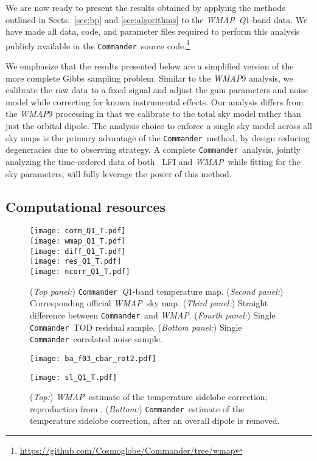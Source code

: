 \documentclass[twocolumn]{aa}
\def\WMAP{\emph{WMAP}}
\def\commander{\texttt{Commander}}
\newcommand{\Q}[0]{\textit Q}
\begin{document}
We are now ready to present the results obtained by applying the methods
outlined in Sects.~\ref{sec:bp} and \ref{sec:algorithms} to the \WMAP\ \Q1-band
data. We have made all data, code, and parameter files required to perform this
analysis publicly available in the \commander\ source
code.\footnote{\url{https://github.com/Cosmoglobe/Commander/tree/wmap}}

We emphasize that the results presented below are a simplified version of the
more complete Gibbs sampling problem. Similar to the \WMAP9 analysis, we
calibrate the raw data to a fixed signal and adjust the gain parameters and
noise model while correcting for known instrumental effects. Our analysis
differs from the \WMAP9 processing in that we calibrate to the total sky model
rather than just the orbital dipole. The analysis choice to enforce a single
sky model across all sky maps is the primary advantage of the \commander\
method, by design reducing degeneracies due to observing strategy. A complete
\commander\ analysis, jointly analyzing the time-ordered data of both \Planck\
LFI and \WMAP\ while fitting for the sky parameters, will fully leverage the
power of this method.


\subsection{Computational resources}

\begin{figure}
  \centering
	\texttt{[image: comm\_Q1\_T.pdf]}\\
	\texttt{[image: wmap\_Q1\_T.pdf]}\\
	\texttt{[image: diff\_Q1\_T.pdf]}\\
	\texttt{[image: res\_Q1\_T.pdf]}\\
	\texttt{[image: ncorr\_Q1\_T.pdf]}        
	\caption{(\textit{Top panel:}) \commander\ \Q1-band temperature
          map. (\textit{Second panel:}) Corresponding official
          \WMAP\ sky map. (\textit{Third panel:}) Straight difference
          between \commander\ and \WMAP. (\textit{Fourth panel:}) Single
          \commander\ TOD residual sample. (\textit{Bottom panel:})
          Single \commander\ correlated noise sample.
            }
	\label{fig:skymaps}
\end{figure}

\begin{figure}
	\texttt{[image: ba\_f03\_cbar\_rot2.pdf]}
	\begin{center}
  	\texttt{[image: sl\_Q1\_T.pdf]}
	\end{center}
	\caption{(\textit{Top:}) 
          \WMAP\ estimate of the temperature sidelobe correction;
          reproduction from \citet{barnes2003}. (\textit{Bottom:})
          \commander\ estimate of the temperature sidelobe correction, after an overall dipole is removed.}
	\label{fig:T_sidelobes}
\end{figure}
\end{document}
